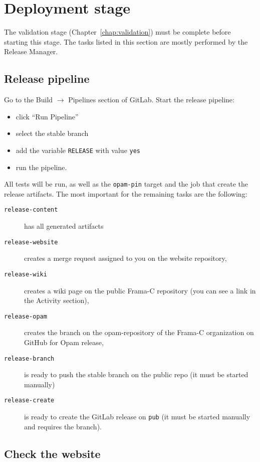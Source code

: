 \chapter{Deployment stage}
\label{chap:deploy}

The validation stage (Chapter~\ref{chap:validation}) must be complete before
starting this stage. The tasks listed in this section are mostly performed by
the Release Manager.

\section{Release pipeline}

Go to the Build $\rightarrow$ Pipelines section of GitLab. Start the release pipeline:
\begin{itemize}
  \item click ``Run Pipeline''
  \item select the stable branch
  \item add the variable \texttt{RELEASE} with value \texttt{yes}
  \item run the pipeline.
\end{itemize}

All tests will be run, as well as the \texttt{opam-pin} target and the job that
create the release artifacts. The most important for the remaining tasks are the
following:
\begin{description}
\item[\texttt{release-content}] has all generated artifacts
\item[\texttt{release-website}] creates a merge request assigned to
  you on the website repository,
\item[\texttt{release-wiki}] creates a wiki page on the public
  Frama-C repository (you can see a link in the Activity section),
\item[\texttt{release-opam}] creates the branch on the opam-repository
  of the Frama-C organization on GitHub for Opam release,
\item[\texttt{release-branch}] is ready to push the stable branch on
  the public repo (it must be started manually)
\item[\texttt{release-create}] is ready to create the GitLab release
  on \texttt{pub} (it must be started manually and requires the branch).
\end{description}

\section{Check the website}

